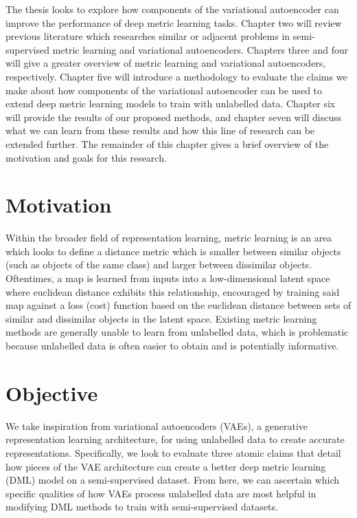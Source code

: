 \documentclass[./dissertation.tex]{subfiles}
\begin{document}
 
    \vspace{3in}
    The thesis looks to explore how components of the variational autoencoder can improve the performance of deep metric learning tasks. Chapter two will review previous literature which researches similar or adjacent problems in semi-supervised metric learning and variational autoencoders. Chapters three and four will give a greater overview of metric learning and variational autoencoders, respectively. Chapter five will introduce a methodology to evaluate the claims we make about how components of the variational autoencoder can be used to extend deep metric learning models to train with unlabelled data. Chapter six will provide the results of our proposed methods, and chapter seven will discuss what we can learn from these results and how this line of research can be extended further. The remainder of this chapter gives a brief overview of the motivation and goals for this research. 

    \section{Motivation}
    Within the broader field of representation learning, metric learning is an area which looks to define a distance metric which is smaller between similar objects (such as objects of the same class) and larger between dissimilar objects. Oftentimes, a map is learned from inputs into a low-dimensional latent space where euclidean distance exhibits this relationship, encouraged by training said map against a loss (cost) function based on the euclidean distance between sets of similar and dissimilar objects in the latent space. Existing metric learning methods are generally unable to learn from unlabelled data, which is problematic because unlabelled data is often easier to obtain and is potentially informative.

    \section{Objective}
    We take inspiration from variational autoencoders (VAEs), a generative representation learning architecture, for using unlabelled data to create accurate representations. Specifically, we look to evaluate three atomic claims that detail how pieces of the VAE architecture can create a better deep metric learning (DML) model on a semi-supervised dataset. From here, we can ascertain which specific qualities of how VAEs process unlabelled data are most helpful in modifying DML methods to train with semi-supervised datasets. \\
    
\end{document}
